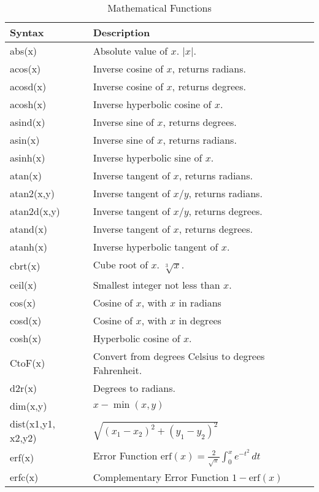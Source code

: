 \begin{longtable}{lp{4.0in}}
\caption{Mathematical Functions}\label{t:functions}\\
Syntax              & Description \\
\hline
\endhead
abs(x)              &  Absolute value of $x$. $|x|$.\\
acos(x)             &  Inverse cosine of $x$, returns radians.\\
acosd(x)            &  Inverse cosine of $x$, returns degrees.\\
acosh(x)            &  Inverse hyperbolic cosine of $x$.\\
asind(x)            &  Inverse sine of $x$, returns degrees.\\
asin(x)             &  Inverse sine of $x$, returns radians.\\
asinh(x)            &  Inverse hyperbolic sine of $x$.\\
atan(x)             &  Inverse tangent of $x$, returns radians.\\
atan2(x,y)          &  Inverse tangent of $x/y$, returns radians.\\
atan2d(x,y)         &  Inverse tangent of $x/y$, returns degrees.\\
atand(x)            &  Inverse tangent of $x$, returns degrees.\\
atanh(x)            &  Inverse hyperbolic tangent of $x$.\\
cbrt(x)             &  Cube root of $x$. $\sqrt[3]{x}$. \\
ceil(x)             &  Smallest integer not less than $x$.\\
cos(x)              &  Cosine of $x$, with $x$ in radians\\
cosd(x)             &  Cosine of $x$, with $x$ in degrees\\
cosh(x)             &  Hyperbolic cosine of $x$.\\
CtoF(x)             &  Convert from degrees Celsius to degrees Fahrenheit. \\
d2r(x)              &  Degrees to radians.\\
dim(x,y)            &  $x - \min(x,y)$\\
dist(x1,y1, x2,y2)  &  $\sqrt{(x_1-x_2)^2 + (y_1-y_2)^2}$ \\
erf(x)              &  Error Function $\mathrm{erf}(x)=\frac{2}{\sqrt{\pi}}\int_{0}^{x}e^{-t^{2}}\, dt$ \\
erfc(x)             &  Complementary Error Function $1-\mathrm{erf}(x)$ \\

\end{longtable}
